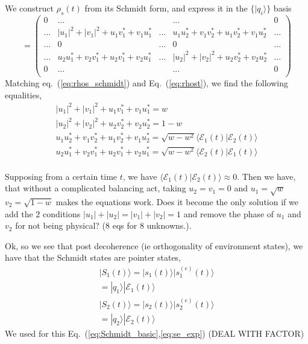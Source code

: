 \documentclass{article}
\begin{document}
We construct $\rho_s(t)$ from its Schmidt form, and express it in the $\{|q_i\rangle\}$ basis
\begin{equation}
    =\begin{pmatrix}
        0 & ... & & ... & 0 \\
        ... & |u_1|^2+|v_1|^2+u_1v_1^*+v_1u_1^* & ... & u_1u_2^*+v_1v_2^*+u_1v_2^*+v_1u_2^* & ... \\
        ... & 0 & ... & 0 & ... \\
        ... & u_2u_1^*+v_2v_1^*+u_2v_1^*+v_2u_1^* & ... & |u_2|^2+|v_2|^2+u_2v_2^*+v_2u_2^* & ... \\
        0 & ... & & ... & 0 \\
    \end{pmatrix}
    \label{eq:rhos_schmidt}
\end{equation}
Matching eq.~(\ref{eq:rhos_schmidt}) and Eq.~(\ref{eq:rhost}), we find the following equalities,
\begin{align*}
    |u_1|^2+|v_1|^2+u_1v_1^*+v_1u_1^* = w\\
    |u_2|^2+|v_2|^2+u_2v_2^*+v_2u_2^* = 1-w\\
    u_1u_2^*+v_1v_2^*+u_1v_2^*+v_1u_2^* = \sqrt{w-w^2}\langle\mathcal{E}_1(t)|\mathcal{E}_2(t)\rangle\\
    u_2u_1^*+v_2v_1^*+u_2v_1^*+v_2u_1^* = \sqrt{w-w^2}\langle \mathcal{E}_2(t)|\mathcal{E}_1(t)\rangle\\
\end{align*}

Supposing from a certain time $t$, we have $\langle \mathcal{E}_1(t)|\mathcal{E}_2(t)\rangle\approx0$. Then we have, that without a complicated balancing act, taking $u_2=v_1=0$ and $u_1=\sqrt{w}$ $v_2=\sqrt{1-w}$ makes the equations work. Does it become the only solution if we add the 2 conditions $|u_1|+|u_2|=|v_1|+|v_2|=1$ and remove the phase of $u_1$ and $v_2$ for not being physical? (8 eqs for 8 unknowns.).

Ok, so we see that post decoherence (ie orthogonality of environment states), we have that the Schmidt states are pointer states,
\begin{align*}
    |S_1(t)\rangle = |s_1(t)\rangle|s^{(e)}_1(t)\rangle\\
    =|q_1\rangle|\mathcal{E}_1(t)\rangle
    \\
    |S_2(t)\rangle = |s_2(t)\rangle|s^{(e)}_2(t)\rangle\\
    =|q_2\rangle|\mathcal{E}_2(t)\rangle
\end{align*}
We used for this Eq.~(\ref{eq:Schmidt_basic},\ref{eq:se_exp}) (DEAL WITH FACTOR)
\end{document}
